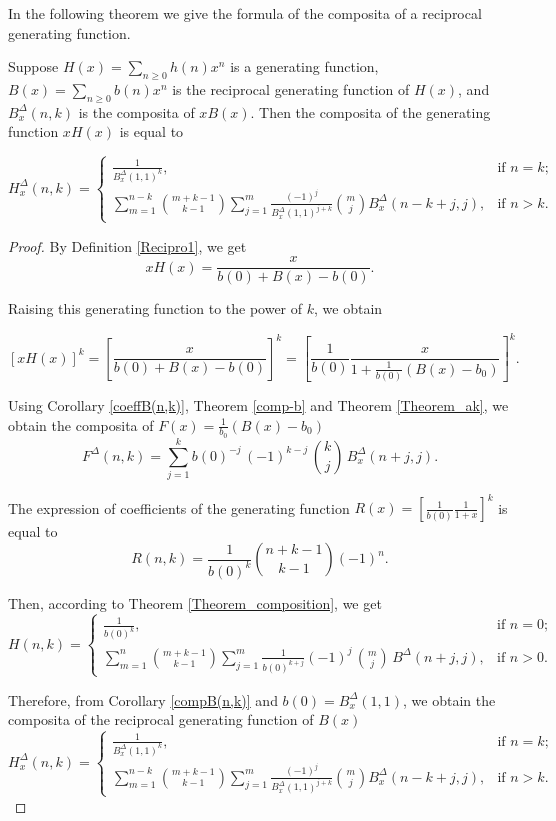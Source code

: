 \documentclass[12pt]{article}
\begin{document}
In the following theorem we give the formula of the composita of a reciprocal generating function.
\begin{theorem}
\label{recip_Theorem}
Suppose  $H(x)=\sum_{n\geq 0}h(n)x^n$ is a generating function, $B(x)=\sum_{n\geq 0}b(n)x^n$ is the reciprocal generating function of $H(x)$, and $B_x^{\Delta}(n,k)$ is the composita of $xB(x)$. Then the composita of the generating function $xH(x)$ is equal to

\begin{equation}
H_x^{\Delta}(n,k)=
\begin{cases}
\frac{1}{B_x^{\Delta}(1,1)^{k}}, & \text{if $n=k$};\\
\sum\limits_{m=1}^{n-k}\binom{m+k-1}{k-1}
 \sum\limits_{j=1}^{m}\frac{(-1)^{j}}{B_x^{\Delta}(1,1)^{j+k}}\binom{m}{j}B_x^{\Delta}(n-k+j,j), &
 \text{if $n>k$}.
\end{cases}
\label{Reciprocal}
\end{equation}
\end{theorem}

\begin{proof} By Definition \ref{Recipro1}, we get  
$$
xH(x)=\frac{x}{b(0)+B(x)-b(0)}.
$$

Raising this generating function to the power of $k$, we obtain

$$
[xH(x)]^k=\left[\frac{x}{b(0)+B(x)-b(0)}\right]^k=\left[\frac{1}{b(0)}\frac{x}{1+\frac{1}{b(0)}(B(x)-b_0)}\right]^k.
$$

Using Corollary \ref{coeffB(n,k)}, Theorem \ref{comp-b} and Theorem \ref{Theorem_ak}, we obtain the composita of $F(x)=\frac{1}{b_0}(B(x)-b_0)$
$$
F^{\Delta}(n,k)=\sum_{j=1}^{k}{b(0)^{-j}\,(-1)^{k
 -j}\,{{k}\choose{j}}\,B_x^{\Delta}(n+j,j)}.
$$

The expression of coefficients of the generating function $R(x)=\left[\frac{1}{b(0)}\frac{1}{1+x}\right]^k$ is equal to
$$
R(n,k)=\frac{1}{b(0)^k}{n+k-1 \choose k-1}(-1)^{n}.
$$

Then, according to Theorem \ref{Theorem_composition}, we get
$$
H(n,k)=\begin{cases}
\frac{1}{b(0)^k}, & \text{if $n=0$};\\
\sum_{m=1}^n{m+k-1 \choose k-1}\sum_{j=1}^{m}\frac{1}{b(0)^{k+j}}(-1)^{j}\,{{m}\choose{j}}\,B^{\Delta}(n+j,j), & \text{if $n>0$}.
\end{cases}
$$

Therefore, from Corollary \ref{compB(n,k)} and $b(0)=B_x^{\Delta}(1,1)$, we obtain the composita of the reciprocal generating function of $B(x)$
$$
H_x^{\Delta}(n,k)=
\begin{cases}
\frac{1}{B_x^{\Delta}(1,1)^{k}}, & \text{if $n=k$};\\
\sum\limits_{m=1}^{n-k}\binom{m+k-1}{k-1}
 \sum\limits_{j=1}^{m}\frac{(-1)^{j}}{B_x^{\Delta}(1,1)^{j+k}}\binom{m}{j}B_x^{\Delta}(n-k+j,j), &
 \text{if $n>k$}.
\end{cases}
$$
\end{proof}
\end{document}
